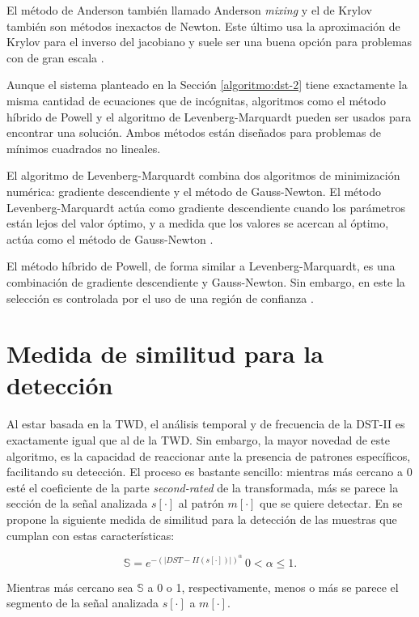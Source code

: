 El método de Anderson también llamado Anderson \textit{mixing} \cite{Eyert1996} y el de Krylov también son métodos inexactos de Newton. 
Este último usa la aproximación de Krylov para el inverso del jacobiano y suele ser una buena opción para problemas
con de gran escala \cite{kelley1995iterative}.

Aunque el sistema planteado en la Sección \ref{algoritmo:dst-2} tiene exactamente la misma cantidad de ecuaciones que de 
incógnitas, algoritmos como el método híbrido de Powell y el algoritmo de Levenberg-Marquardt pueden 
ser usados para encontrar una solución. Ambos métodos están diseñados para problemas de mínimos cuadrados no lineales.

El algoritmo de Levenberg-Marquardt combina dos algoritmos de minimización numérica:
gradiente descendiente y el método de Gauss-Newton. El método Levenberg-Marquardt actúa como gradiente 
descendiente cuando los parámetros están lejos del valor óptimo, y a medida que los valores se acercan 
al óptimo, actúa como el método de Gauss-Newton \cite{lourakis}.

El método híbrido de Powell, de forma similar a Levenberg-Marquardt, es una combinación de gradiente descendiente y Gauss-Newton.
Sin embargo, en este la selección es controlada por el uso de una región de confianza \cite{lourakis}.

\section{Medida de similitud para la detección}

Al estar basada en la TWD, el análisis temporal y de frecuencia de la DST-II es exactamente igual que al de la TWD.
Sin embargo, la mayor novedad de este algoritmo, es la capacidad de reaccionar ante la presencia de 
patrones específicos, facilitando su detección. El proceso es bastante sencillo:
mientras más cercano a $0$ esté el coeficiente de la parte \textit{second-rated} de la transformada, más se parece
la sección de la señal analizada $s[\cdot]$ al patrón $m[\cdot]$ que se quiere detectar. En \cite{Guido2018} se
propone la siguiente medida de similitud para la detección de las muestras que cumplan con estas características:

\begin{equation}
	\mathbb{S} = e^{-{(|DST-II(s[\cdot])|)}^{\alpha}} \,0 < \alpha \leq 1.
\end{equation}\label{eq:s-heuristic}

Mientras más cercano sea $\mathbb{S}$ a 0 o 1, respectivamente, menos o más se parece el segmento de
la señal analizada $s[\cdot]$ a $m[\cdot]$.

